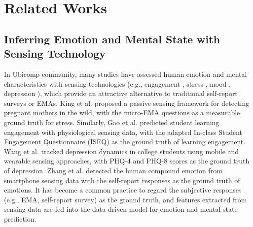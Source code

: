 \documentclass[sigconf]{acmart}
\begin{document}

\section{Related Works}
\label{sec:relatedwork}

\subsection{Inferring Emotion and Mental State with Sensing Technology}

In Ubicomp community, many studies have assessed human emotion and mental characteristics with sensing technologies (e.g., engagement \cite{gao2020n,huynh2018engagemon}, stress \cite{king2019microstress}, mood \cite{morshed2019prediction,wang2014studentlife}, depression \cite{bakker2011what,wang2018trackingdepression}), which provide an attractive alternative to traditional self-report surveys or EMAs.  King et al. \cite{king2019microstress} proposed a passive sensing framework for detecting pregnant mothers in the wild, with the micro-EMA questions as a measurable ground truth for stress. Similarly, Gao et al. \cite{gao2020n} predicted student learning engagement with physiological sensing data, with the adapted In-class Student Engagement Questionnaire (ISEQ) \cite{fuller2018development} as the ground truth of learning engagement. Wang et al. \cite{wang2018trackingdepression} tracked depression dynamics in college students using  mobile and wearable sensing approaches, with PHQ-4 \cite{kroenke2009phq4} and PHQ-8 \cite{kroenke2009phq8} scores as the ground truth of depression. Zhang et al. \cite{Moodexplorer} detected the human compound emotion from smartphone sensing data with the self-report responses as the ground truth of emotions. It has become a common practice to regard the subjective responses (e.g., EMA, self-report survey) as the ground truth, and features extracted from sensing data are fed into the data-driven model for emotion and mental state prediction.
\end{document}

